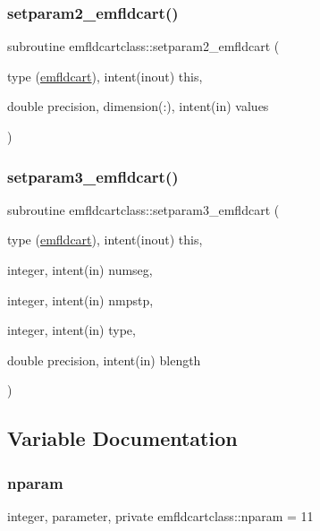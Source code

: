 \mbox{\label{namespaceemfldcartclass_a49c36692c057476c17ea403564e4f057}} 
\subsubsection{\texorpdfstring{setparam2\_emfldcart()}{setparam2\_emfldcart()}}
{\footnotesize\ttfamily subroutine emfldcartclass\+::setparam2\+\_\+emfldcart (\begin{DoxyParamCaption}\item[{type (\mbox{\hyperlink{namespaceemfldcartclass_structemfldcartclass_1_1emfldcart}{emfldcart}}), intent(inout)}]{this,  }\item[{double precision, dimension(\+:), intent(in)}]{values }\end{DoxyParamCaption})}

\mbox{\label{namespaceemfldcartclass_a1091548d2fbca6e19b3861f96b834bfc}} 
\subsubsection{\texorpdfstring{setparam3\_emfldcart()}{setparam3\_emfldcart()}}
{\footnotesize\ttfamily subroutine emfldcartclass\+::setparam3\+\_\+emfldcart (\begin{DoxyParamCaption}\item[{type (\mbox{\hyperlink{namespaceemfldcartclass_structemfldcartclass_1_1emfldcart}{emfldcart}}), intent(inout)}]{this,  }\item[{integer, intent(in)}]{numseg,  }\item[{integer, intent(in)}]{nmpstp,  }\item[{integer, intent(in)}]{type,  }\item[{double precision, intent(in)}]{blength }\end{DoxyParamCaption})}



\subsection{Variable Documentation}
\mbox{\label{namespaceemfldcartclass_a72ee7da1adbf56a707b72607da000549}} 
\subsubsection{\texorpdfstring{nparam}{nparam}}
{\footnotesize\ttfamily integer, parameter, private emfldcartclass\+::nparam = 11\hspace{0.3cm}{\ttfamily [private]}}

